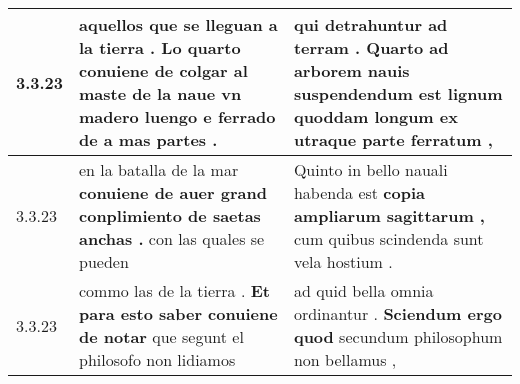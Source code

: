 \begin{tabular}{|p{1cm}|p{6.5cm}|p{6.5cm}|}
3.3.23 & aquellos que se lleguan a la tierra . \textbf{ Lo quarto conuiene de colgar al maste de la } naue vn madero luengo e ferrado de a mas partes . & qui detrahuntur ad terram . \textbf{ Quarto ad arborem nauis suspendendum est lignum quoddam longum } ex utraque parte ferratum , \\\hline
3.3.23 & en la batalla de la mar \textbf{ conuiene de auer grand conplimiento de saetas anchas . } con las quales se pueden & Quinto in bello nauali habenda est \textbf{ copia ampliarum sagittarum , } cum quibus scindenda sunt vela hostium . \\\hline
3.3.23 & commo las de la tierra . \textbf{ Et para esto saber conuiene de notar } que segunt el philosofo non lidiamos & ad quid bella omnia ordinantur . \textbf{ Sciendum ergo quod } secundum philosophum non bellamus , \\\hline

\end{tabular}
